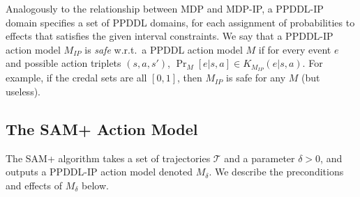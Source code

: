 \documentclass[letterpaper]{article} %
\newtheorem{definition}{Definition}
\newcommand{\tuple}[1]{\ensuremath{\left \langle #1 \right \rangle }}
\newcommand{\ip}{\textit{IP}}
\begin{document}


Analogously to the relationship between MDP and MDP-IP, a PPDDL-IP domain specifies a set of PPDDL domains, for each assignment of probabilities to effects that satisfies the given interval constraints. 
We say that a PPDDL-IP action model $M_\ip$ is  \emph{safe} w.r.t.\ a PPDDL action model $M$ if for every event $e$ and possible action triplets $(s,a,s')$, $\Pr_{M}[e|s,a]\in K_{M_{IP}}(e|s,a)$. For example, if the credal sets are all $[0,1]$, then $M_\ip$ is  safe for any $M$ (but useless).






\subsection{The SAM+ Action Model}


The SAM+ algorithm takes a set of trajectories $\mathcal{T}$ and a parameter $\delta>0$, and outputs a PPDDL-IP action model denoted $M_\delta$. We describe the preconditions and effects of $M_\delta$ below. 
\end{document}
